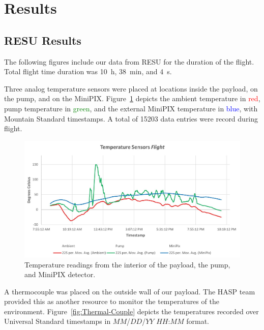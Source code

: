 \section{Results}
\subsection{RESU Results}
\label{sec:Flight-Results}


The following figures include our data from RESU for the duration of the flight. Total flight time duration was \SI{10}{\hour}, \SI{38}{\minute}, and \SI{4}{\second}.

Three analog temperature sensors were placed at locations inside the payload, on the pump, and on the MiniPIX.  Figure~\ref{fig:Temperatures} depicts the ambient temperature in \textcolor{red}{red}, pump temperature in \textcolor{green}{green}, and the external MiniPIX temperature in \textcolor{blue}{blue}, with Mountain Standard timestamps. A total of \num{15203} data entries were record during flight.

\begin{figure}[H]
\centering
\includegraphics[width=\textwidth, keepaspectratio]{./Figures/temperatures.jpg}
\caption{Temperature readings from the interior of the payload, the pump, and MiniPIX detector.}
\label{fig:Temperatures}
\end{figure}
\clearpage
A thermocouple was placed on the outside wall of our payload.  The HASP team provided this as another resource to monitor the temperatures of the environment.  Figure~\ref{fig:Thermal-Couple} depicts the temperatures recorded over Universal Standard timestamps in $MM$/$DD$/$YY$ $HH$:$MM$ format. 

